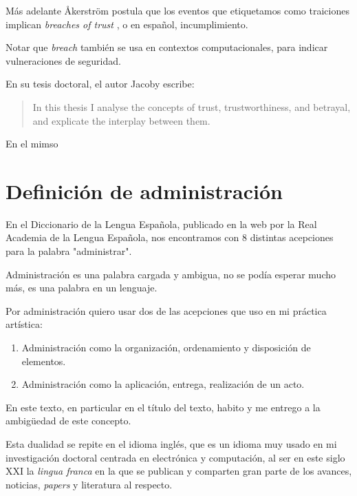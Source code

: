 \documentclass{article}
\begin{document}
Más adelante Åkerström postula que los eventos que etiquetamos como traiciones implican \textit{breaches of trust} \cite[p. 1]{betrayalBetrayersAkerstrom}, o en español, incumplimiento.

Notar que \textit{breach} también se usa en contextos computacionales, para indicar vulneraciones de seguridad.

En su tesis doctoral, el autor Jacoby escribe:

\begin{quote}
In this thesis I analyse the concepts of trust, trustworthiness, and betrayal, and
explicate the interplay between them. \cite[p. 1]{trustBetrayalJacoby}
\end{quote}



En el mimso 

\clearpage

\section{Definición de administración}

En el Diccionario de la Lengua Española, publicado en la web por la Real Academia de la Lengua Española, nos encontramos con 8 distintas acepciones para la palabra "administrar"\cite{administrar}.

Administración es una palabra cargada y ambigua, no se podía esperar mucho más, es una palabra en un lenguaje.

Por administración quiero usar dos de las acepciones que uso en mi práctica artística:

\begin{enumerate}
    \item Administración como la organización, ordenamiento y disposición de elementos.
    \item Administración como la aplicación, entrega, realización de un acto.
\end{enumerate}

En este texto, en particular en el título del texto, habito y me entrego a la ambigüedad de este concepto.

Esta dualidad se repite en el idioma inglés, que es un idioma muy usado en mi investigación doctoral centrada en electrónica y computación, al ser en este siglo XXI la \textit{lingua franca} en la que se publican y comparten gran parte de los avances, noticias, \textit{papers} y literatura al respecto.

\clearpage
\end{document}
